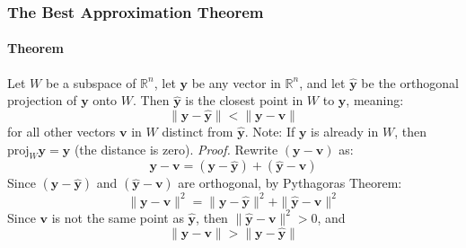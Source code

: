 \documentclass[../linear-algebra.tex]{subfiles}
\begin{document}
\subsubsection{The Best Approximation Theorem}
\paragraph{Theorem} Let $W$ be a subspace of $\mathbb{R}^n$, let $\mathbf{y}$ be any vector in $\mathbb{R}^n$, and let $\hat{\mathbf{y}}$ be the orthogonal projection of $\mathbf{y}$ onto $W$. Then $\hat{\mathbf{y}}$ is the closest point in $W$ to $\mathbf{y}$, meaning:
$$\|\mathbf{y} - \hat{\mathbf{y}}\| < \|\mathbf{y} - \mathbf{v}\|$$
for all other vectors $\mathbf{v}$ in $W$ distinct from $\hat{\mathbf{y}}$.\newline
Note: If $\mathbf{y}$ is already in $W$, then $\text{proj}_W \mathbf{y} = \mathbf{y}$ (the distance is zero).\newline
\textit{Proof.} Rewrite $(\mathbf{y} - \mathbf{v})$ as:
$$\mathbf{y} - \mathbf{v} = (\mathbf{y} - \hat{\mathbf{y}}) + (\hat{\mathbf{y}} - \mathbf{v})$$
Since $(\mathbf{y} - \hat{\mathbf{y}})$ and $(\hat{\mathbf{y}} - \mathbf{v})$ are orthogonal, by Pythagoras Theorem:
$$\|\mathbf{y} - \mathbf{v}\|^2 = \|\mathbf{y} - \hat{\mathbf{y}}\|^2 + \|\hat{\mathbf{y}} - \mathbf{v}\|^2$$
Since $\mathbf{v}$ is not the same point as $\hat{\mathbf{y}}$, then $\|\hat{\mathbf{y}} - \mathbf{v}\|^2 > 0$, and 
$$\|\mathbf{y} - \mathbf{v}\| > \|\mathbf{y} - \hat{\mathbf{y}}\|$$
\end{document}
